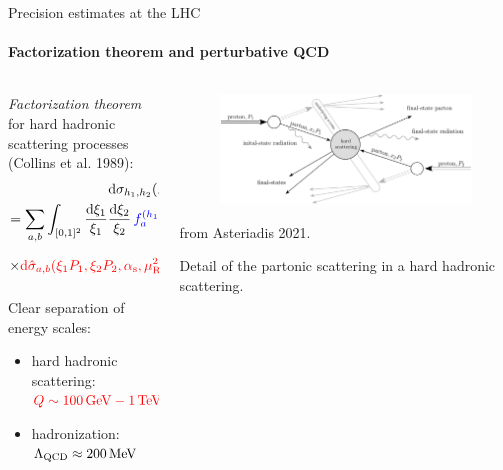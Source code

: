 
\begin{frame}{Precision estimates at the LHC}
  \framesubtitle{Factorization theorem and perturbative QCD}

  \begin{columns}

    \begin{column}{0.55 \textwidth}

      \justifying
      \emph{Factorization theorem} for hard hadronic scattering processes (Collins et al. 1989):
      \small
      \begin{multline*}
        \mathrm{d}\sigma_{h_1 , h_2}(P_1 , P_2) \\
        = \sum_{a,b} \int_{[0,1]^2} \frac{\mathrm{d} \xi_1}{\xi_1} \frac{\mathrm{d} \xi_2}{\xi_2} \,\textcolor{blue}{f_{a}^{(h_1)}(\xi_1, \mu_\text{F}^2) \,f_{b}^{(h_2)}(\xi_2, \mu_\text{F}^2)} \times \\
        \times \textcolor{red}{\mathrm{d}\hat{\sigma}_{a,b}(\xi_1 P_1, \xi_2 P_2, \alpha_\text{s}, \mu_\text{R}^2, \mu_\text{F}^2)}
        \left[ 1 + o \left( \frac{\Lambda_\text{QCD}^n}{Q^n} \right) \right]
      \end{multline*}

      Clear separation of energy scales:
      \begin{itemize}
        \item hard hadronic scattering: $ \textcolor{red}{Q \sim 100\,\mathrm{GeV} - 1\,\mathrm{TeV}} $
        \item hadronization: $ \Lambda_\text{QCD} \approx 200\,\mathrm{MeV} $
      \end{itemize}

    \end{column}

    \begin{column}{0.45 \textwidth}

      \begin{figure}
        \centering
        \includegraphics[width = \textwidth]{../imgs/part-scatt.png}
      \end{figure}

       from Asteriadis 2021.

      \justifying
      Detail of the partonic scattering in a hard hadronic scattering.

    \end{column}

  \end{columns}

\end{frame}


